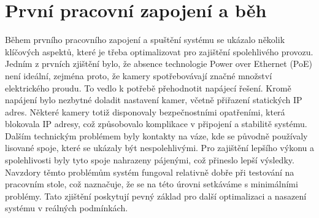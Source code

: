 
\section{První pracovní zapojení a běh}\label{sec:prvni-pracovni-zapojeni-a-beh}
Během prvního pracovního zapojení a spuštění systému se ukázalo několik klíčových aspektů, které je třeba optimalizovat pro zajištění spolehlivého provozu.
Jedním z prvních zjištění bylo, že absence technologie Power over Ethernet (PoE) není ideální, zejména proto, že kamery spotřebovávají značné množství elektrického proudu.
To vedlo k potřebě přehodnotit napájecí řešení.
\newline
Kromě napájení bylo nezbytné doladit nastavení kamer, včetně přiřazení statických IP adres.
Některé kamery totiž disponovaly bezpečnostními opatřeními, která blokovala IP adresy, což způsobovalo komplikace v připojení a stabilitě systému.
\newline
Dalším technickým problémem byly kontakty na váze, kde se původně používaly lisované spoje, které se ukázaly být nespolehlivými.
Pro zajištění lepšího výkonu a spolehlivosti byly tyto spoje nahrazeny pájenými, což přineslo lepší výsledky.
\newline
Navzdory těmto problémům systém fungoval relativně dobře při testování na pracovním stole, což naznačuje, že se na této úrovni setkáváme s minimálními problémy.
Tato zjištění poskytují pevný základ pro další optimalizaci a nasazení systému v reálných podmínkách.


\newpage


